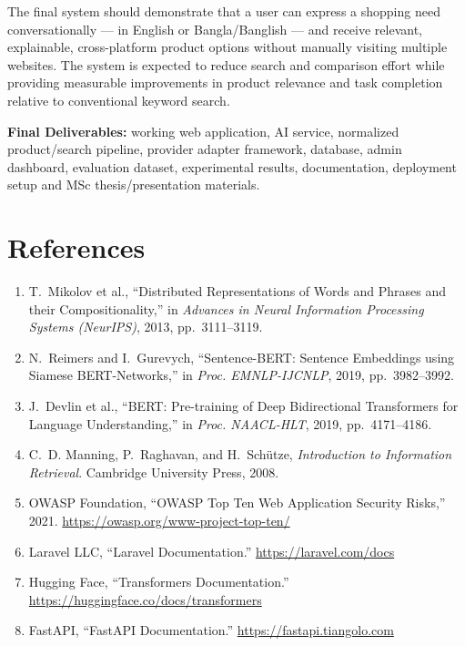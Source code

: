 \documentclass[12pt,a4paper]{article}
\begin{document}
The final system should demonstrate that a user can express a shopping need conversationally --- in English or
Bangla/Banglish --- and receive relevant, explainable, cross-platform product options without manually visiting
multiple websites. The system is expected to reduce search and comparison effort while providing measurable
improvements in product relevance and task completion relative to conventional keyword search.

\noindent\textbf{Final Deliverables:} working web application, AI service, normalized product/search pipeline,
provider adapter framework, database, admin dashboard, evaluation dataset, experimental results, documentation,
deployment setup and MSc thesis/presentation materials.

\section{References}
\begin{enumerate}[leftmargin=1.3cm]
    \item T.~Mikolov et al., ``Distributed Representations of Words and Phrases and their Compositionality,'' in
    \textit{Advances in Neural Information Processing Systems (NeurIPS)}, 2013, pp.~3111--3119.
    \item N.~Reimers and I.~Gurevych, ``Sentence-BERT: Sentence Embeddings using Siamese BERT-Networks,'' in
    \textit{Proc. EMNLP-IJCNLP}, 2019, pp.~3982--3992.
    \item J.~Devlin et al., ``BERT: Pre-training of Deep Bidirectional Transformers for Language Understanding,''
    in \textit{Proc. NAACL-HLT}, 2019, pp.~4171--4186.
    \item C.~D. Manning, P.~Raghavan, and H.~Sch\"utze, \textit{Introduction to Information Retrieval}. Cambridge
    University Press, 2008.
    \item OWASP Foundation, ``OWASP Top Ten Web Application Security Risks,'' 2021.
    \url{https://owasp.org/www-project-top-ten/}
    \item Laravel LLC, ``Laravel Documentation.'' \url{https://laravel.com/docs}
    \item Hugging Face, ``Transformers Documentation.'' \url{https://huggingface.co/docs/transformers}
    \item FastAPI, ``FastAPI Documentation.'' \url{https://fastapi.tiangolo.com}
\end{enumerate}
\end{document}
